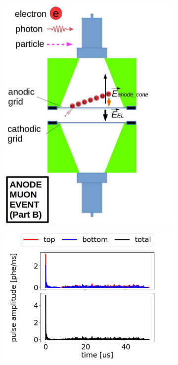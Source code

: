 \begin{figure}[!htbp]
\begin{subfigure}[b]{0.8\textwidth}
		\includegraphics[width=\halfwidth,clip,trim={0 0 0 0}]{Figures/GasTest/WeiDrawEvent/AnodeMuonEventB.jpg}
		\caption{}
		\label{fig:muon anode b}
	\end{subfigure}
	\par\bigskip
	\begin{subfigure}[b]{0.7\textwidth}
		\centering
		\includegraphics[width=\figurewidth,clip,trim={0 0 0 0}]{Figures/GasTest/exampleWaveforms/proc64767AnodeMuon1.jpg}

\end{subfigure}
\end{figure}
